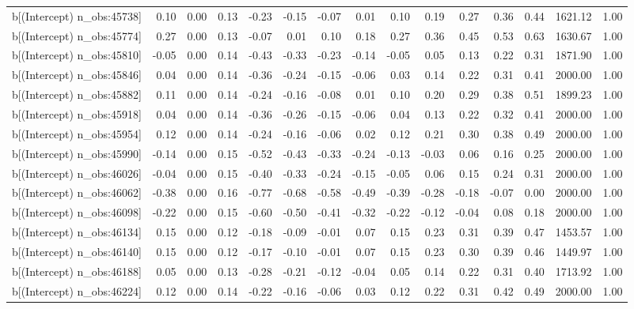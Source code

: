 \begin{table}[ht]
\begin{tabular}{rrrrrrrrrrrrrrr}
  b[(Intercept) n\_obs:45738] & 0.10 & 0.00 & 0.13 & -0.23 & -0.15 & -0.07 & 0.01 & 0.10 & 0.19 & 0.27 & 0.36 & 0.44 & 1621.12 & 1.00 \\ 
  b[(Intercept) n\_obs:45774] & 0.27 & 0.00 & 0.13 & -0.07 & 0.01 & 0.10 & 0.18 & 0.27 & 0.36 & 0.45 & 0.53 & 0.63 & 1630.67 & 1.00 \\ 
  b[(Intercept) n\_obs:45810] & -0.05 & 0.00 & 0.14 & -0.43 & -0.33 & -0.23 & -0.14 & -0.05 & 0.05 & 0.13 & 0.22 & 0.31 & 1871.90 & 1.00 \\ 
  b[(Intercept) n\_obs:45846] & 0.04 & 0.00 & 0.14 & -0.36 & -0.24 & -0.15 & -0.06 & 0.03 & 0.14 & 0.22 & 0.31 & 0.41 & 2000.00 & 1.00 \\ 
  b[(Intercept) n\_obs:45882] & 0.11 & 0.00 & 0.14 & -0.24 & -0.16 & -0.08 & 0.01 & 0.10 & 0.20 & 0.29 & 0.38 & 0.51 & 1899.23 & 1.00 \\ 
  b[(Intercept) n\_obs:45918] & 0.04 & 0.00 & 0.14 & -0.36 & -0.26 & -0.15 & -0.06 & 0.04 & 0.13 & 0.22 & 0.32 & 0.41 & 2000.00 & 1.00 \\ 
  b[(Intercept) n\_obs:45954] & 0.12 & 0.00 & 0.14 & -0.24 & -0.16 & -0.06 & 0.02 & 0.12 & 0.21 & 0.30 & 0.38 & 0.49 & 2000.00 & 1.00 \\ 
  b[(Intercept) n\_obs:45990] & -0.14 & 0.00 & 0.15 & -0.52 & -0.43 & -0.33 & -0.24 & -0.13 & -0.03 & 0.06 & 0.16 & 0.25 & 2000.00 & 1.00 \\ 
  b[(Intercept) n\_obs:46026] & -0.04 & 0.00 & 0.15 & -0.40 & -0.33 & -0.24 & -0.15 & -0.05 & 0.06 & 0.15 & 0.24 & 0.31 & 2000.00 & 1.00 \\ 
  b[(Intercept) n\_obs:46062] & -0.38 & 0.00 & 0.16 & -0.77 & -0.68 & -0.58 & -0.49 & -0.39 & -0.28 & -0.18 & -0.07 & 0.00 & 2000.00 & 1.00 \\ 
  b[(Intercept) n\_obs:46098] & -0.22 & 0.00 & 0.15 & -0.60 & -0.50 & -0.41 & -0.32 & -0.22 & -0.12 & -0.04 & 0.08 & 0.18 & 2000.00 & 1.00 \\ 
  b[(Intercept) n\_obs:46134] & 0.15 & 0.00 & 0.12 & -0.18 & -0.09 & -0.01 & 0.07 & 0.15 & 0.23 & 0.31 & 0.39 & 0.47 & 1453.57 & 1.00 \\ 
  b[(Intercept) n\_obs:46140] & 0.15 & 0.00 & 0.12 & -0.17 & -0.10 & -0.01 & 0.07 & 0.15 & 0.23 & 0.30 & 0.39 & 0.46 & 1449.97 & 1.00 \\ 
  b[(Intercept) n\_obs:46188] & 0.05 & 0.00 & 0.13 & -0.28 & -0.21 & -0.12 & -0.04 & 0.05 & 0.14 & 0.22 & 0.31 & 0.40 & 1713.92 & 1.00 \\ 
  b[(Intercept) n\_obs:46224] & 0.12 & 0.00 & 0.14 & -0.22 & -0.16 & -0.06 & 0.03 & 0.12 & 0.22 & 0.31 & 0.42 & 0.49 & 2000.00 & 1.00 \\ 

\end{tabular}
\end{table}
